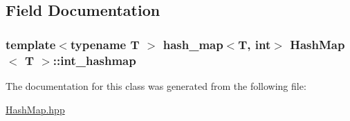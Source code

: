 \subsection{\-Field \-Documentation}
\hypertarget{classHashMap_a2b6bacf8f358c4ffab078168b7b9eb63}{
\subsubsection[{int\-\_\-hashmap}]{\setlength{\rightskip}{0pt plus 5cm}template$<$typename T $>$ hash\-\_\-map$<$\-T, int$>$ {\bf \-Hash\-Map}$<$ \-T $>$\-::{\bf int\-\_\-hashmap}}}\label{classHashMap_a2b6bacf8f358c4ffab078168b7b9eb63}


\-The documentation for this class was generated from the following file\-:\begin{DoxyCompactItemize}
\item 
\hyperlink{HashMap_8hpp}{\-Hash\-Map.\-hpp}\end{DoxyCompactItemize}

